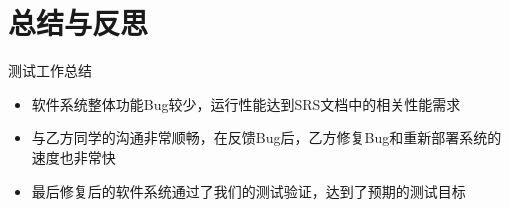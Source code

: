 %
%
%
%
\section{总结与反思}
\begin{frame}{测试工作总结}
    \begin{itemize}
        \item 软件系统整体功能Bug较少，运行性能达到SRS文档中的相关性能需求
        \item 与乙方同学的沟通非常顺畅，在反馈Bug后，乙方修复Bug和重新部署系统的速度也非常快
        \item 最后修复后的软件系统通过了我们的测试验证，达到了预期的测试目标
    \end{itemize}
\end{frame}
